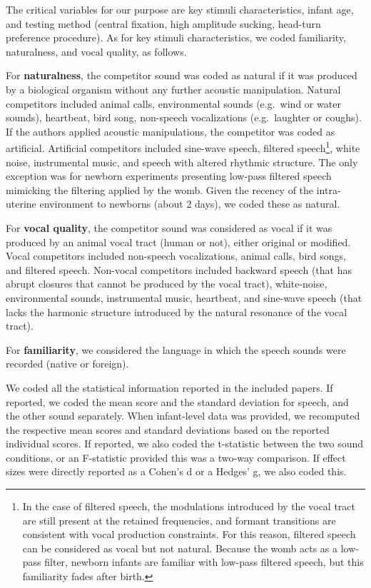 \documentclass[
  english,
  man]{apa6}
\begin{document}
The critical variables for our purpose are key stimuli characteristics, infant age, and testing method (central fixation, high amplitude sucking, head-turn preference procedure). As for key stimuli characteristics, we coded familiarity, naturalness, and vocal quality, as follows.

For \textbf{naturalness}, the competitor sound was coded as natural if it was produced by a biological organism without any further acoustic manipulation. Natural competitors included animal calls, environmental sounds (e.g.~wind or water sounds), heartbeat, bird song, non-speech vocalizations (e.g.~laughter or coughs). If the authors applied acoustic manipulations, the competitor was coded as artificial. Artificial competitors included sine-wave speech, filtered speech\footnote{In the case of filtered speech, the modulations introduced by the vocal tract are still present at the retained frequencies, and formant transitions are consistent with vocal production constraints. For this reason, filtered speech can be considered as vocal but not natural. Because the womb acts as a low-pass filter, newborn infants are familiar with low-pass filtered speech, but this familiarity fades after birth.}, white noise, instrumental music, and speech with altered rhythmic structure. The only exception was for newborn experiments presenting low-pass filtered speech mimicking the filtering applied by the womb. Given the recency of the intra-uterine environment to newborns (about 2 days), we coded these as natural.

For \textbf{vocal quality}, the competitor sound was considered as vocal if it was produced by an animal vocal tract (human or not), either original or modified. Vocal competitors included non-speech vocalizations, animal calls, bird songs, and filtered speech. Non-vocal competitors included backward speech (that has abrupt closures that cannot be produced by the vocal tract), white-noise, environmental sounds, instrumental music, heartbeat, and sine-wave speech (that lacks the harmonic structure introduced by the natural resonance of the vocal tract).

For \textbf{familiarity}, we considered the language in which the speech sounds were recorded (native or foreign).

We coded all the statistical information reported in the included papers. If reported, we coded the mean score and the standard deviation for speech, and the other sound separately. When infant-level data was provided, we recomputed the respective mean scores and standard deviations based on the reported individual scores. If reported, we also coded the t-statistic between the two sound conditions, or an F-statistic provided this was a two-way comparison. If effect sizes were directly reported as a Cohen's d or a Hedges' g, we also coded this.
\end{document}
